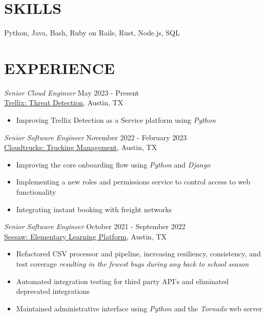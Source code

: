 \documentclass[margin, 9pt]{res} %
\begin{document}
\begin{resume}

\section{SKILLS}

Python, Java, Bash, Ruby on Rails, Rust, Node.js, SQL\\
 
 
\section{EXPERIENCE}
{\sl Senior Cloud Engineer} \hfill May 2023 - Present \\
\href{https://www.trellix.com/}{Trellix: Threat Detection}, Austin, TX
\begin{itemize}
    \item Improving Trellix Detection as a Service platform using {\it Python}
\end{itemize}


{\sl Senior Software Engineer} \hfill November 2022 - February 2023 \\
\href{https://www.cloudtrucks.com/}{Cloudtrucks: Trucking Management}, Austin, TX
\begin{itemize}
    \item Improving the core onboarding flow using {\it Python} and {\it Django}
    \item Implementing a new roles and permissions service to control access to web functionality
    \item Integrating instant booking with freight networks
\end{itemize}

{\sl Senior Software Engineer} \hfill October 2021 - September 2022 \\
\href{https://web.seesaw.me/}{Seesaw: Elementary Learning Platform}, Austin, TX
\begin{itemize}
    \item Refactored CSV processor and pipeline, increasing resiliency, consistency, and test coverage {\it resulting in the fewest bugs during any back to school season}
    \item Automated integration testing for third party API's and eliminated deprecated integrations
    \item Maintained administrative interface using {\it Python} and the {\it Tornado} web server
\end{itemize}


\end{resume}
\end{document}
